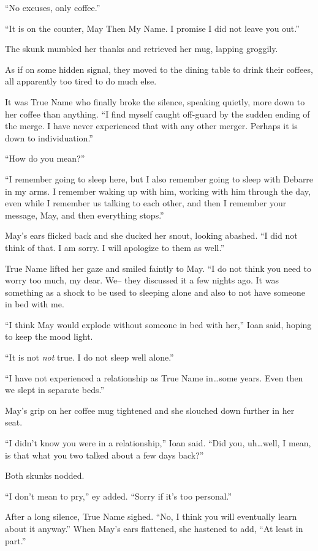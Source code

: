 ``No excuses, only coffee.''

``It is on the counter, May Then My Name. I promise I did not leave you out.''

The skunk mumbled her thanks and retrieved her mug, lapping groggily.

As if on some hidden signal, they moved to the dining table to drink their coffees, all apparently too tired to do much else.

It was True Name who finally broke the silence, speaking quietly, more down to her coffee than anything. ``I find myself caught off-guard by the sudden ending of the merge. I have never experienced that with any other merger. Perhaps it is down to individuation.''

``How do you mean?''

``I remember going to sleep here, but I also remember going to sleep with Debarre in my arms. I remember waking up with him, working with him through the day, even while I remember us talking to each other, and then I remember your message, May, and then everything stops.''

May's ears flicked back and she ducked her snout, looking abashed. ``I did not think of that. I am sorry. I will apologize to them as well.''

True Name lifted her gaze and smiled faintly to May. ``I do not think you need to worry too much, my dear. We-- they discussed it a few nights ago. It was something as a shock to be used to sleeping alone and also to not have someone in bed with me.

``I think May would explode without someone in bed with her,'' Ioan said, hoping to keep the mood light.

``It is not \emph{not} true. I do not sleep well alone.''

``I have not experienced a relationship as True Name in\ldots some years. Even then we slept in separate beds.''

May's grip on her coffee mug tightened and she slouched down further in her seat.

``I didn't know you were in a relationship,'' Ioan said. ``Did you, uh\ldots well, I mean, is that what you two talked about a few days back?''

Both skunks nodded.

``I don't mean to pry,'' ey added. ``Sorry if it's too personal.''

After a long silence, True Name sighed. ``No, I think you will eventually learn about it anyway.'' When May's ears flattened, she hastened to add, ``At least in part.''

